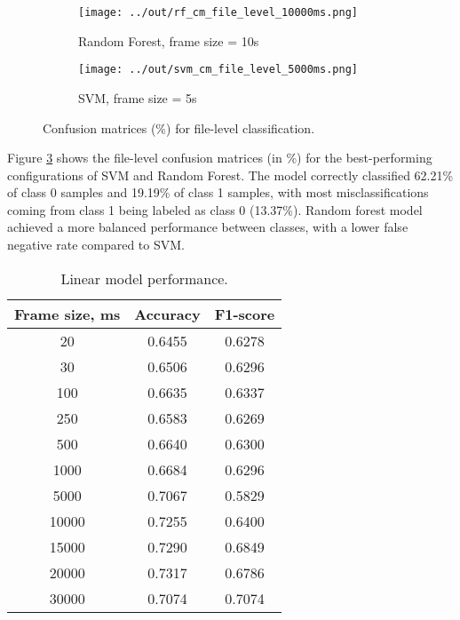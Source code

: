 \documentclass[conference]{IEEEtran}
\begin{document}
\begin{figure}[ht]
    \centering
    \captionsetup{font=small}
    \begin{subfigure}[b]{0.23\textwidth}
        \centering
        \texttt{[image: ../out/rf\_cm\_file\_level\_10000ms.png]}
        \caption{Random Forest, frame size = 10s}
        \label{fig:cm_rf_10s}
    \end{subfigure}
    \hfill
    \begin{subfigure}[b]{0.23\textwidth}
        \centering
        \texttt{[image: ../out/svm\_cm\_file\_level\_5000ms.png]}
        \caption{SVM, frame size = 5s}
        \label{fig:cm_svm_5s}
    \end{subfigure}
    \caption{Confusion matrices (\%) for file-level classification.}
    \label{fig:cm_comparison}
\end{figure}

Figure \ref{fig:cm_comparison} shows the file-level confusion matrices (in \%) for the best-performing configurations of SVM and Random Forest.
The model correctly classified 62.21\% of class 0 samples and 19.19\% of class 1 samples, with most misclassifications coming from class 1 being labeled as class 0 (13.37\%).
Random forest model achieved a more balanced performance between classes, with a lower false negative rate compared to SVM.


\begin{table}[h]
\centering
\caption{Linear model performance.}
\begin{tabular}{|c|c|c|}
\hline
\textbf{Frame size, ms} & \textbf{Accuracy} & \textbf{F1-score}\\
\hline
20 & 0.6455 & 0.6278 \\
\hline
30 & 0.6506 & 0.6296 \\
\hline
100 & 0.6635 & 0.6337 \\
\hline
250 & 0.6583 & 0.6269 \\
\hline
500 & 0.6640 & 0.6300 \\
\hline
1000 & 0.6684 & 0.6296 \\
\hline
5000 & 0.7067 & 0.5829 \\
\hline
10000 & 0.7255 & 0.6400 \\
\hline
15000 & 0.7290 & 0.6849 \\
\hline
20000 & 0.7317 & 0.6786 \\
\hline
30000 & 0.7074 & 0.7074 \\
\hline
\end{tabular}
\label{tab:linear_model_perf}
\end{table}
\end{document}
